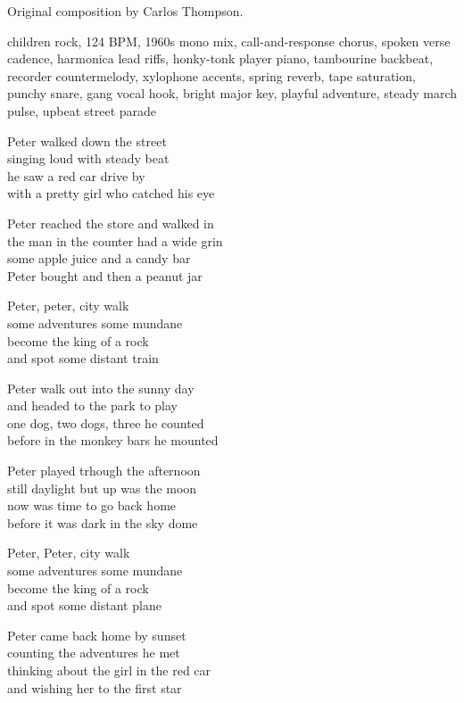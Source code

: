 
\begin{notes}
Original composition by Carlos Thompson.
\end{notes}
\begin{style}
children rock, 124 BPM, 1960s mono mix, call-and-response chorus, spoken verse cadence, harmonica lead riffs, honky-tonk player piano, tambourine backbeat, recorder countermelody, xylophone accents, spring reverb, tape saturation, punchy snare, gang vocal hook, bright major key, playful adventure, steady march pulse, upbeat street parade
\end{style}
\begin{lyrics}
Peter walked down the street\\
singing loud with steady beat\\
he saw a red car drive by\\
with a pretty girl who catched his eye

Peter reached the store and walked in\\
the man in the counter had a wide grin\\
some apple juice and a candy bar\\
Peter bought and then a peanut jar

Peter, peter, city walk\\
some adventures some mundane\\
become the king of a rock\\
and spot some distant train

Peter walk out into the sunny day\\
and headed to the park to play\\
one dog, two dogs, three he counted\\
before in the monkey bars he mounted

Peter played trhough the afternoon\\
still daylight but up was the moon\\
now was time to go back home\\
before it was dark in the sky dome

Peter, Peter, city walk\\
some adventures some mundane\\
become the king of a rock\\
and spot some distant plane

Peter came back home by sunset\\
counting the adventures he met\\
thinking about the girl in the red car\\
and wishing her to the first star
\end{lyrics}


